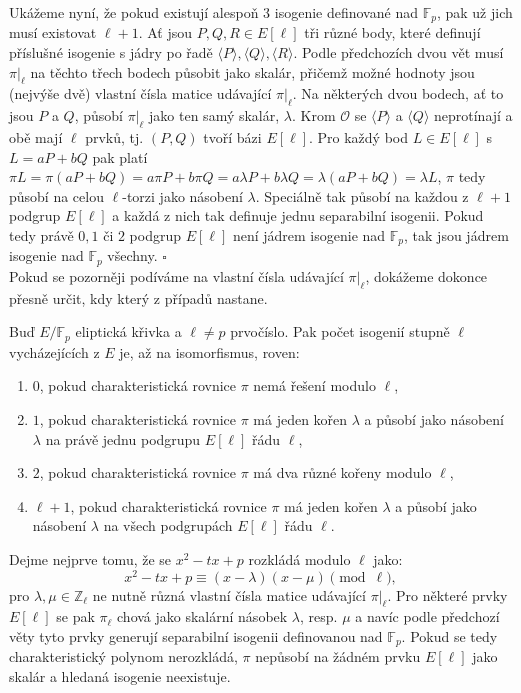\documentclass[12pt]{report}
\begin{document}
Ukážeme nyní, že pokud existují alespoň $3$ isogenie definované nad $\mathbb{F}_p$, pak už jich musí existovat $\ell+1$. Ať jsou $P,Q,R \in E[\ell]$ tři různé body, které definují příslušné isogenie s jádry po řadě $\langle P\rangle, \langle Q \rangle, \langle R \rangle$. Podle předchozích dvou vět musí $\pi\vert_\ell$ na těchto třech bodech působit jako skalár, přičemž možné hodnoty jsou (nejvýše dvě) vlastní čísla matice udávající $\pi \vert_{\ell}$. Na některých dvou bodech, ať to jsou $P$ a $Q$, působí $\pi \vert_{\ell}$ jako ten samý skalár, $\lambda$. Krom $\mathcal{O}$ se $\langle P \rangle$ a $\langle Q \rangle$ neprotínají a obě mají $\ell$ prvků, tj. $(P,Q)$ tvoří bázi $E[\ell]$. Pro každý bod $L \in E[\ell]$ s $L = aP+bQ$ pak platí $\pi L = \pi(aP+bQ) = a \pi P + b \pi Q = a \lambda P + b \lambda Q = \lambda(aP + bQ) = \lambda L$, $\pi$ tedy působí na celou $\ell$-torzi jako násobení $\lambda$. Speciálně tak působí na každou z $\ell+1$ podgrup $E[\ell]$ a každá z nich tak definuje jednu separabilní isogenii. Pokud tedy právě $0,1$ či $2$ podgrup $E[\ell]$ není jádrem isogenie nad $\mathbb{F}_p$, tak jsou jádrem isogenie nad $\mathbb{F}_p$ všechny. \hfill $\square$\\

Pokud se pozorněji podíváme na vlastní čísla udávající $\pi \vert_{\ell}$, dokážeme dokonce přesně určit, kdy který z případů nastane.

\begin{veta}
Buď $E/\mathbb{F}_p$ eliptická křivka a $\ell \neq p$ prvočíslo. Pak počet isogenií stupně $\ell$ vycházejících z $E$ je, až na isomorfismus, roven:
\begin{enumerate}
\item $0$, pokud charakteristická rovnice $\pi$ nemá řešení modulo $\ell$,
\item $1$, pokud charakteristická rovnice $\pi$ má jeden kořen $\lambda$ a působí jako násobení $\lambda$ na právě jednu podgrupu $E[\ell]$ řádu $\ell$,
\item $2$, pokud charakteristická rovnice $\pi$ má dva různé kořeny modulo $\ell$,
\item $\ell+1$, pokud charakteristická rovnice $\pi$ má jeden kořen $\lambda$ a působí jako násobení $\lambda$ na všech podgrupách $E[\ell]$ řádu $\ell$.
\end{enumerate}

\end{veta}

Dejme nejprve tomu, že se $x^2 - tx+p$ rozkládá modulo $\ell$ jako:
\begin{equation*}
x^2 - tx + p \equiv (x-\lambda) (x- \mu) \pmod{\ell},
\end{equation*} 
pro $\lambda,\mu \in \mathbb{Z}_{\ell}$ ne nutně různá vlastní čísla matice udávající $\pi \vert_{\ell}$. Pro některé prvky $E[\ell]$ se pak $\pi_{\ell}$ chová jako skalární násobek $\lambda$, resp. $\mu$ a navíc podle předchozí věty tyto prvky generují separabilní isogenii definovanou nad $\mathbb{F}_p$. Pokud se tedy charakteristický polynom nerozkládá, $\pi$ nepůsobí na žádném prvku $E[\ell]$ jako skalár a hledaná isogenie neexistuje.
\end{document}
